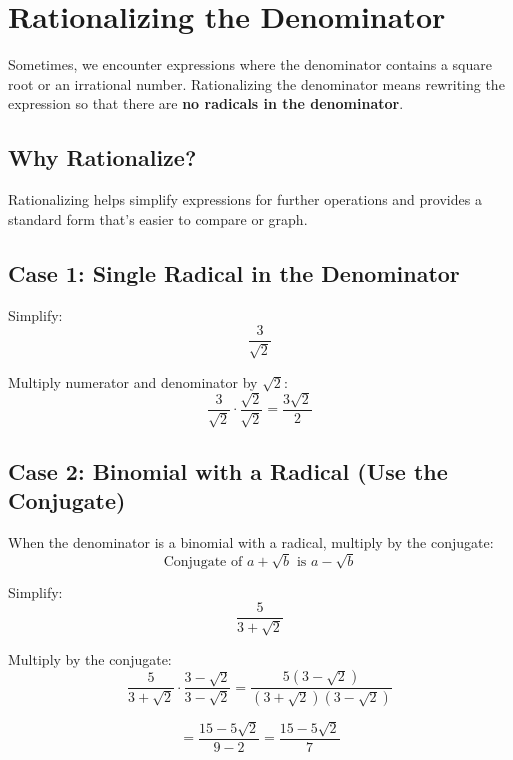 \documentclass[11pt]{article}
\begin{document}
\section{Rationalizing the Denominator}

Sometimes, we encounter expressions where the denominator contains a square root or an irrational number. Rationalizing the denominator means rewriting the expression so that there are \textbf{no radicals in the denominator}.

\vspace{1em}

\subsection*{Why Rationalize?}
Rationalizing helps simplify expressions for further operations and provides a standard form that’s easier to compare or graph.

\subsection*{Case 1: Single Radical in the Denominator}

\begin{tcolorbox}[colback=blue!5!white, colframe=blue!80!black, title=Example: Single Radical]
Simplify:
\[
\frac{3}{\sqrt{2}}
\]

Multiply numerator and denominator by \( \sqrt{2} \):
\[
\frac{3}{\sqrt{2}} \cdot \frac{\sqrt{2}}{\sqrt{2}} = \frac{3\sqrt{2}}{2}
\]
\end{tcolorbox}

\subsection*{Case 2: Binomial with a Radical (Use the Conjugate)}

When the denominator is a binomial with a radical, multiply by the conjugate:
\[
\text{Conjugate of } a + \sqrt{b} \text{ is } a - \sqrt{b}
\]

\begin{tcolorbox}[colback=purple!5!white, colframe=purple!80!black, title=Example: Binomial Denominator]
Simplify:
\[
\frac{5}{3 + \sqrt{2}}
\]

Multiply by the conjugate:
\[
\frac{5}{3 + \sqrt{2}} \cdot \frac{3 - \sqrt{2}}{3 - \sqrt{2}} = \frac{5(3 - \sqrt{2})}{(3 + \sqrt{2})(3 - \sqrt{2})}
\]

\[
= \frac{15 - 5\sqrt{2}}{9 - 2} = \frac{15 - 5\sqrt{2}}{7}
\]
\end{tcolorbox}
\end{document}
